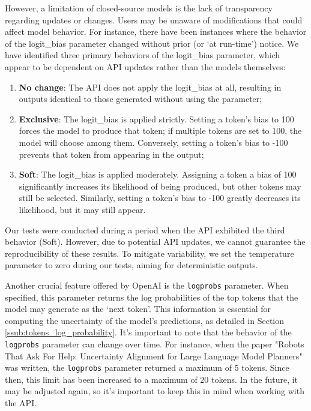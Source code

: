 However, a limitation of closed-source models is the lack of transparency regarding
updates or changes. Users may be unaware of modifications that could affect
model behavior. For instance, there have been instances where the behavior of
the logit\_bias parameter changed without prior (or `at run-time') notice. We have
identified three primary behaviors of the logit\_bias parameter, which appear to
be dependent on API updates rather than the models themselves:
\begin{enumerate}
  \item \textbf{No change}: The API does not apply the logit\_bias at all,
    resulting in outputs identical to those generated without using the
    parameter;

  \item \textbf{Exclusive}: The logit\_bias is applied strictly. Setting a token's
    bias to 100 forces the model to produce that token; if multiple tokens are set
    to 100, the model will choose among them. Conversely, setting a token's bias
    to -100 prevents that token from appearing in the output;

  \item \textbf{Soft}: The logit\_bias is applied moderately. Assigning a token
    a bias of 100 significantly increases its likelihood of being produced, but other
    tokens may still be selected. Similarly, setting a token's bias to -100
    greatly decreases its likelihood, but it may still appear.
\end{enumerate}

Our tests were conducted during a period when the API exhibited the third
behavior (Soft). However, due to potential API updates, we cannot guarantee the reproducibility
of these results. To mitigate variability, we set the temperature parameter to zero
during our tests, aiming for deterministic outputs.

Another crucial feature offered by OpenAI is the \texttt{logprobs} parameter.
When specified, this parameter returns the log probabilities of the top tokens that
the model may generate as the `next token'. This information is essential for
computing the uncertainty of the model's predictions, as detailed in Section \ref{ssub:tokens_log_probability}.
It's important to note that the behavior of the \texttt{logprobs} parameter can change
over time. For instance, when the paper "Robots That Ask For Help: Uncertainty Alignment
for Large Language Model Planners" was written, the \texttt{logprobs} parameter
returned a maximum of 5 tokens. Since then, this limit has been increased to a
maximum of 20 tokens. In the future, it may be adjusted again, so it's important
to keep this in mind when working with the API.

